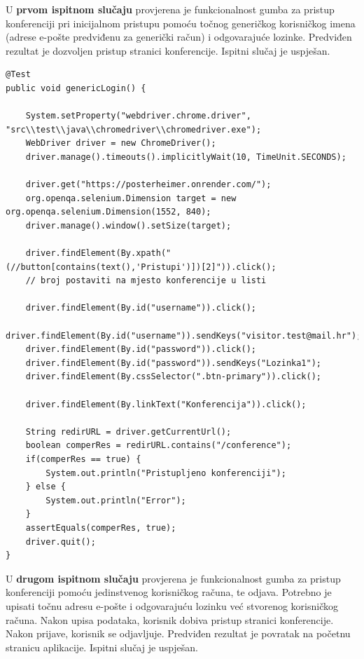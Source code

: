 			\newpage
			
			U \textbf{prvom ispitnom slučaju} provjerena je funkcionalnost gumba za pristup konferenciji pri inicijalnom pristupu pomoću točnog generičkog korisničkog imena (adrese e-pošte predviđenu za generički račun) i odgovarajuće lozinke. Predviđen rezultat je dozvoljen pristup stranici konferencije. Ispitni slučaj je uspješan.
			
			
			\begin{lstlisting}
@Test
public void genericLogin() {
	
	System.setProperty("webdriver.chrome.driver", "src\\test\\java\\chromedriver\\chromedriver.exe");
	WebDriver driver = new ChromeDriver();
	driver.manage().timeouts().implicitlyWait(10, TimeUnit.SECONDS);
	
	driver.get("https://posterheimer.onrender.com/");
	org.openqa.selenium.Dimension target = new  org.openqa.selenium.Dimension(1552, 840);
	driver.manage().window().setSize(target);
	
	driver.findElement(By.xpath("(//button[contains(text(),'Pristupi')])[2]")).click();
	// broj postaviti na mjesto konferencije u listi
	
	driver.findElement(By.id("username")).click();
	driver.findElement(By.id("username")).sendKeys("visitor.test@mail.hr");
	driver.findElement(By.id("password")).click();
	driver.findElement(By.id("password")).sendKeys("Lozinka1");
	driver.findElement(By.cssSelector(".btn-primary")).click();
	
	driver.findElement(By.linkText("Konferencija")).click();
	
	String redirURL = driver.getCurrentUrl();
	boolean comperRes = redirURL.contains("/conference");
	if(comperRes == true) {
		System.out.println("Pristupljeno konferenciji");
	} else {
		System.out.println("Error");
	}
	assertEquals(comperRes, true);
	driver.quit();
}
			\end{lstlisting}
			
			U \textbf{drugom ispitnom slučaju} provjerena je funkcionalnost gumba za pristup konferenciji pomoću jedinstvenog korisničkog računa, te odjava. Potrebno je upisati točnu adresu e-pošte i odgovarajuću lozinku već stvorenog korisničkog računa. Nakon upisa podataka, korisnik dobiva pristup stranici konferencije. Nakon prijave, korisnik se odjavljuje. Predviđen rezultat je povratak na početnu stranicu aplikacije. Ispitni slučaj je uspješan.  

